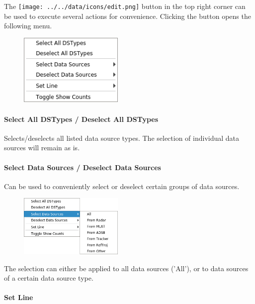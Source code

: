 The \texttt{[image: ../../data/icons/edit.png]} button in the top right corner can be used to execute several actions for convenience.
Clicking the button opens the following menu.

\begin{figure}[H]
    \center
    \includegraphics[width=5cm,frame]{figures/ui_data_source_configmenu.png}
\end{figure}

\paragraph{Select All DSTypes / Deselect All DSTypes}

Selects/deselects all listed data source types. The selection of individual data sources will remain as is.

\paragraph{Select Data Sources / Deselect Data Sources}

Can be used to conveniently select or deselect certain groups of data sources.

\begin{figure}[H]
    \center
    \includegraphics[width=5cm,frame]{figures/ui_data_source_configmenu_select.png}
\end{figure}

The selection can either be applied to all data sources ('All'), or to data sources of a certain data source type. 

\paragraph{Set Line}

